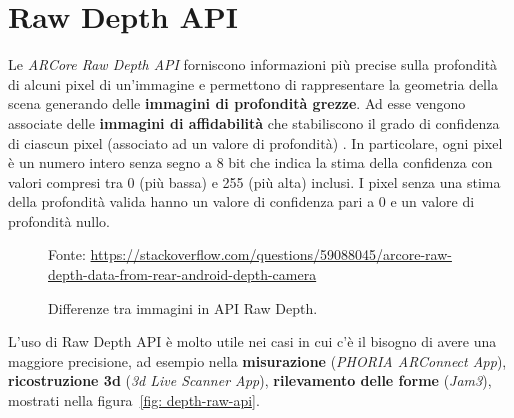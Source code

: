 \documentclass[crop=false, class=book]{standalone}
\begin{document}
		\section{Raw Depth API}
		Le \textit{ARCore Raw Depth API} forniscono informazioni più precise sulla profondità di alcuni pixel di un'immagine e permettono di rappresentare la geometria della scena generando delle \textbf{immagini di profondità grezze}. Ad esse vengono associate delle \textbf{immagini di affidabilità} che stabiliscono il grado di confidenza di ciascun pixel (associato ad un valore di profondità) \cite{mobilear2021rawdepth}. In particolare, ogni pixel è un numero intero senza segno a 8 bit che indica la stima della confidenza con valori compresi tra 0 (più bassa) e 255 (più alta) inclusi. I pixel senza una stima della profondità valida hanno un valore di confidenza pari a 0 e un valore di profondità nullo.
		
		\begin{figure}
			\centering
			{Fonte: \url{https://stackoverflow.com/questions/59088045/arcore-raw-depth-data-from-rear-android-depth-camera}}
			\caption{Differenze tra immagini in API Raw Depth.}
			\label{fig: depth-raw-api}
		\end{figure}
		
		\noindent
		L'uso di Raw Depth API è molto utile nei casi in cui c'è il bisogno di avere una maggiore precisione, ad esempio nella \textbf{misurazione} (\textit{PHORIA ARConnect App}), \textbf{ricostruzione 3d}  (\textit{3d Live Scanner App}), \textbf{rilevamento delle forme} (\textit{Jam3}), mostrati nella figura~\vref{fig: depth-raw-api}.
			
\end{document}

